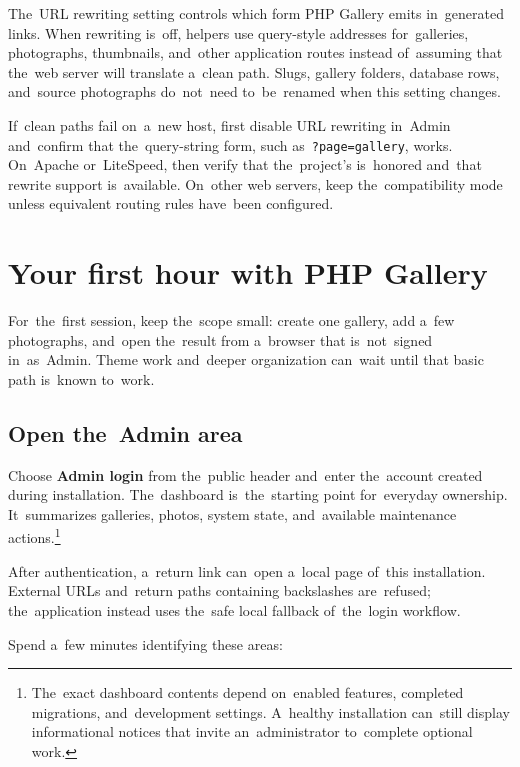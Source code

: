 \documentclass[11pt,a4paper]{article}
\newcommand{\filepath}[1]{\path{#1}}
\newcommand{\ui}[1]{\textbf{#1}}
\newcommand{\codeword}[1]{\nolinkurl{#1}}
\begin{document}
The~URL rewriting setting controls which form PHP Gallery emits in~generated
links. When rewriting is~off, helpers use query-style addresses for~galleries,
photographs, thumbnails, and~other application routes instead of~assuming that
the~web server will translate a~clean path. Slugs, gallery folders, database
rows, and~source photographs do~not~need to~be~renamed when this setting
changes.

If~clean paths fail on~a~new host, first disable URL rewriting in~Admin
and~confirm that the~query-string form, such as~\codeword{?page=gallery}, works.
On~Apache or~LiteSpeed, then verify that the~project's \filepath{.htaccess}
is~honored and~that rewrite support is~available. On~other web servers, keep
the~compatibility mode unless equivalent routing rules have~been configured.

\section{Your first hour with PHP Gallery}
\label{sec:first-hour}

For~the~first session, keep the~scope small: create one gallery, add a~few
photographs, and~open the~result from a~browser that is~not~signed in~as~Admin.
Theme work and~deeper organization can~wait until that basic path is~known
to~work.

\subsection{Open the~Admin area}

Choose \ui{Admin login} from the~public header and~enter the~account created
during installation. The~dashboard is~the~starting point for~everyday ownership.
It~summarizes galleries, photos, system state, and~available maintenance
actions.\footnote{The~exact dashboard contents depend on~enabled features,
completed migrations, and~development settings. A~healthy installation can~still
display informational notices that invite an~administrator to~complete optional
work.}

After authentication, a~return link can~open a~local page of~this installation.
External URLs and~return paths containing backslashes are~refused;
the~application instead uses the~safe local fallback of~the~login workflow.

Spend a~few minutes identifying these areas:
\end{document}
